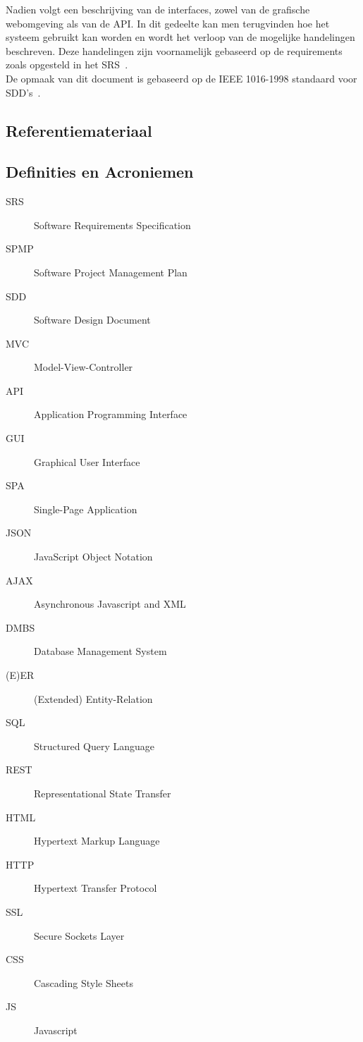 \documentclass{article}
\begin{document}
Nadien volgt een beschrijving van de interfaces, zowel van de grafische webomgeving als van de API. In dit gedeelte kan men terugvinden hoe het systeem gebruikt kan worden en wordt het verloop van de mogelijke handelingen beschreven. Deze handelingen zijn voornamelijk gebaseerd op de requirements zoals opgesteld in het SRS~\cite{Xtreport:SRS}. \\

De opmaak van dit document is gebaseerd op de IEEE 1016-1998 standaard voor SDD's~\citep{website:IEEE}.

\subsection{Referentiemateriaal}
\begingroup
\renewcommand{\section}[2]{}  %

\endgroup
 
\subsection{Definities en Acroniemen}

\begin{description}

\item[SRS] Software Requirements Specification
\item[SPMP] Software Project Management Plan
\item[SDD] Software Design Document
\item[MVC] Model-View-Controller
\item[API] Application Programming Interface
\item[GUI] Graphical User Interface
\item[SPA] Single-Page Application
\item[JSON] JavaScript Object Notation
\item[AJAX] Asynchronous Javascript and XML
\item[DMBS] Database Management System
\item[(E)ER] (Extended) Entity-Relation
\item[SQL] Structured Query Language
\item[REST] Representational State Transfer
\item[HTML] Hypertext Markup Language
\item[HTTP] Hypertext Transfer Protocol
\item[SSL] Secure Sockets Layer
\item[CSS] Cascading Style Sheets
\item[JS] Javascript

\end{description}
\end{document}
